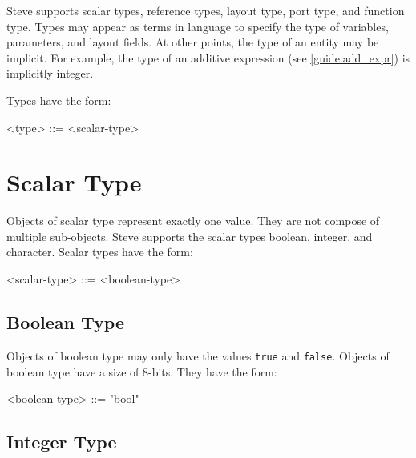Steve supports scalar types, reference types, layout type, port type, and function type. Types may appear as terms in language to specify the type of variables, parameters, and layout fields. At other points, the type of an entity may be implicit. For example, the type of an additive expression (see \ref{guide:add_expr}) is implicitly integer.

Types have the form:

\begin{minip}
\begin{grammar}
<type> ::=
<scalar-type>
\end{grammar}
\end{minip}

\section{Scalar Type} \label{guide:scalar_type}

Objects of scalar type represent exactly one value. They are not compose of multiple sub-objects. Steve supports the scalar types boolean, integer, and character. Scalar types have the form:

\begin{minip}
\begin{grammar}
<scalar-type> ::= <boolean-type>
\end{grammar}
\end{minip}

\subsection{Boolean Type} \label{guide:bool_type}

Objects of boolean type may only have the values \texttt{true} and \texttt{false}. Objects of boolean type have a size of 8-bits. They have the form:

\begin{minip}
\begin{grammar}
<boolean-type> ::= "bool"
\end{grammar}
\end{minip}

\subsection{Integer Type} \label{guide:integer_type}

